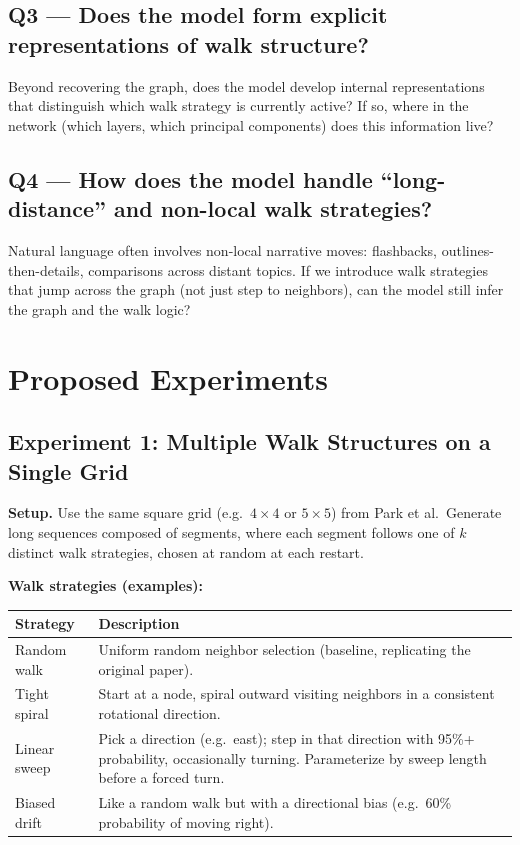 \documentclass[11pt]{article}
\begin{document}
\subsection{Q3 --- Does the model form explicit representations of walk structure?}

Beyond recovering the graph, does the model develop internal representations that distinguish which walk strategy is currently active? If so, where in the network (which layers, which principal components) does this information live?

\subsection{Q4 --- How does the model handle ``long-distance'' and non-local walk strategies?}

Natural language often involves non-local narrative moves: flashbacks, outlines-then-details, comparisons across distant topics. If we introduce walk strategies that jump across the graph (not just step to neighbors), can the model still infer the graph and the walk logic?

\section{Proposed Experiments}
\label{sec:experiments}

\subsection{Experiment 1: Multiple Walk Structures on a Single Grid}

\textbf{Setup.} Use the same square grid (e.g.\ $4\times4$ or $5\times5$) from Park et al.\ Generate long sequences composed of segments, where each segment follows one of $k$ distinct walk strategies, chosen at random at each restart.

\textbf{Walk strategies (examples):}

\begin{table}[h]
\centering
\begin{tabular}{@{}lp{10cm}@{}}
\toprule
\textbf{Strategy} & \textbf{Description} \\
\midrule
Random walk & Uniform random neighbor selection (baseline, replicating the original paper). \\
Tight spiral & Start at a node, spiral outward visiting neighbors in a consistent rotational direction. \\
Linear sweep & Pick a direction (e.g.\ east); step in that direction with 95\%+ probability, occasionally turning. Parameterize by sweep length before a forced turn. \\
Biased drift & Like a random walk but with a directional bias (e.g.\ 60\% probability of moving right). \\
\bottomrule
\end{tabular}
\end{table}
\end{document}
